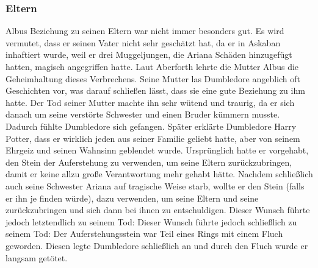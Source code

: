\documentclass[a4paper, 10pt]{article}
\begin{document}
\subsubsection*{Eltern}
Albus Beziehung zu seinen Eltern war nicht immer besonders gut. Es wird vermutet, dass er seinen Vater nicht sehr geschätzt hat, da er in Askaban inhaftiert wurde, weil er drei Muggeljungen, die Ariana Schäden hinzugefügt hatten, magisch angegriffen hatte. Laut Aberforth lehrte die Mutter Albus die Geheimhaltung dieses Verbrechens. Seine Mutter las Dumbledore angeblich oft Geschichten vor, was darauf schließen lässt, dass sie eine gute Beziehung zu ihm hatte. Der Tod seiner Mutter machte ihn sehr wütend und traurig, da er sich danach um seine verstörte Schwester und einen Bruder kümmern musste. Dadurch fühlte Dumbledore sich gefangen.
\vspace{10pt}
\newline
{}  
Später erklärte Dumbledore Harry Potter, dass er wirklich jeden aus seiner Familie geliebt hatte, aber von seinem Ehrgeiz und seinen Wahnsinn geblendet wurde. Ursprünglich hatte er vorgehabt, den Stein der Auferstehung zu verwenden, um seine Eltern zurückzubringen, damit er keine allzu große Verantwortung mehr gehabt hätte. Nachdem schließlich auch seine Schwester Ariana auf tragische Weise starb, wollte er den Stein (falls er ihn je finden würde), dazu verwenden, um seine Eltern und seine zurückzubringen und sich dann bei ihnen zu entschuldigen. Dieser Wunsch führte jedoch letztendlich zu seinem Tod: Dieser Wunsch führte jedoch schließlich zu seinem Tod: Der Auferstehungsstein war Teil eines Rings mit einem Fluch geworden. Diesen legte Dumbledore schließlich an und durch den Fluch wurde er langsam getötet.
\end{document}

